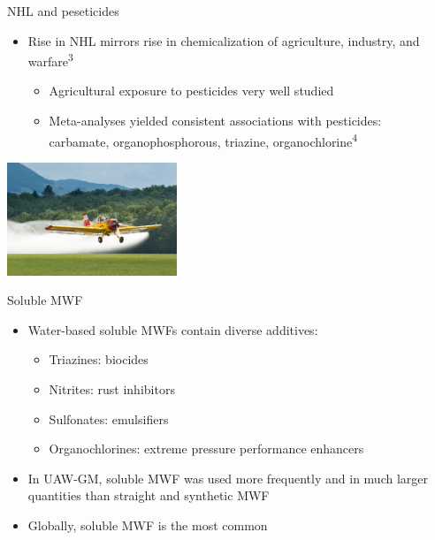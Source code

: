 \documentclass[
  11pt,
  ignorenonframetext,
]{beamer}
\providecommand{\tightlist}{%
  \setlength{\itemsep}{0pt}\setlength{\parskip}{0pt}}
\begin{document}
\begin{frame}{NHL and peseticides}
\protect\hypertarget{nhl-and-peseticides}{}
\begin{itemize}
\tightlist
\item
  Rise in NHL mirrors rise in chemicalization of agriculture, industry,
  and warfare\textsuperscript{3}

  \begin{itemize}
  \tightlist
  \item
    Agricultural exposure to pesticides very well studied
  \item
    Meta-analyses yielded consistent associations with pesticides:\\
    carbamate, organophosphorous, triazine,
    organochlorine\textsuperscript{4}
  \end{itemize}
\end{itemize}

\begin{center}
\includegraphics[width=2in]{./resources/pesticide_aircraft.jpg}
\end{center}

\end{frame}

\begin{frame}{Soluble MWF}
\protect\hypertarget{soluble-mwf}{}
\begin{itemize}
\tightlist
\item
  Water-based soluble MWFs contain diverse additives:\\

  \begin{itemize}
  \tightlist
  \item
    Triazines: biocides
  \item
    Nitrites: rust inhibitors
  \item
    Sulfonates: emulsifiers
  \item
    Organochlorines: extreme pressure performance enhancers
  \end{itemize}
\item
  In UAW-GM, soluble MWF was used more frequently and in much larger
  quantities than straight and synthetic MWF
\item
  Globally, soluble MWF is the most common
\end{itemize}
\end{frame}
\end{document}
